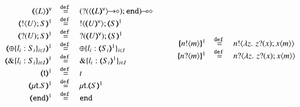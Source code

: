 \begin{figure}[h!]
\[\begin{array}{c}
\begin{array}{rcl}
			\\
			\tmap{\chtype{L}}{\mathsf{v}}	&\defeq& \lhot{(\btinp{\shot{\chtype{\tmap{L}{\mathsf{v}}}}} \tinact)}
			\\
			\tmap{\btout{U} S}{1}		&\defeq& \btout{\tmap{U}{\mathsf{v}}} \tmap{S}{1}
			\\
			\tmap{\btinp{U} S}{1}		&\defeq& \btinp{\tmap{U}{\mathsf{v}}} \tmap{S}{1}
			\\
%
%
			\tmap{\btsel{l_i: S_i}_{i \in I}}{1} &\defeq& \btsel{l_i: \tmap{S_i}{1}}_{i \in I}
			\\
			\tmap{\btbra{l_i: S_i}_{i \in I}}{1} &\defeq& \btbra{l_i: \tmap{S_i}{1}}_{i \in I}
			\\

			\tmap{\vart{t}}{1} &\defeq& {t}
			\\
			\tmap{\trec{t}{S}}{1} &\defeq& \trec{t}{\tmap{S}{1}}
			\\
			\tmap{\tinact}{1} &\defeq& \tinact
		\end{array}
		\qquad
		\begin{array}{rcl}
			\mapa{\bactout{n}{m}}^{1} &\defeq&   \bactout{n}{\abs{z}{\,\binp{z}{x} \appl{x}{m}} }
			\\
			\mapa{\bactinp{n}{m}}^{1} &\defeq&   \bactinp{n}{\abs{z}{\,\binp{z}{x} \appl{x}{m}} }
			\\


\end{array}
\end{array}\]
\end{figure}
